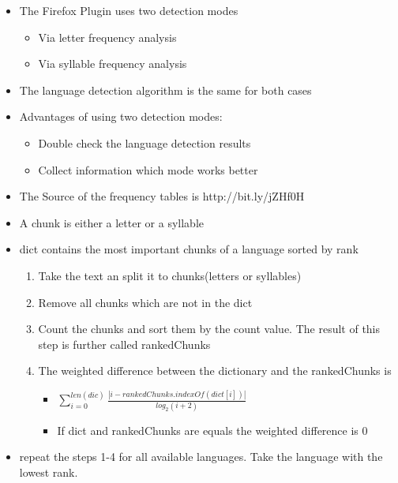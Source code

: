 \begin{frame}[c]
\begin{itemize}
  \item The Firefox Plugin uses two detection modes
  \begin{itemize}
    \item Via letter frequency analysis
    \item Via syllable frequency analysis
  \end{itemize}
  \item The language detection algorithm is the same for both cases
  \item Advantages of using two detection modes:
  \begin{itemize}
    \item Double check the language detection results
    \item Collect information which mode works better
  \end{itemize}
  \item The Source of the frequency tables is http://bit.ly/jZHf0H
\end{itemize}
\end{frame}

\begin{frame}[c]
\begin{itemize}
  \item A chunk is either a letter or a syllable
  \item dict contains the most important chunks of a language sorted by rank
\begin{enumerate}
  \item Take the text an split it to chunks(letters or syllables)
  \item Remove all chunks which are not in the dict
  \item Count the chunks and sort them by the count value. The result of this
  step is further called rankedChunks
  \item The weighted difference between the dictionary and the rankedChunks is
  \begin{itemize}
  \item $ \sum _{i=0}^{len(dic)} \frac{| i - rankedChunks.indexOf(dict[i]) |
  }{log _2 (i+2)}
  $
  \item If dict and rankedChunks are equals the weighted difference is 0
\end{itemize}
\end{enumerate}
\item repeat the steps 1-4 for all available languages. Take the language with
the lowest rank.
\end{itemize}
\end{frame}

